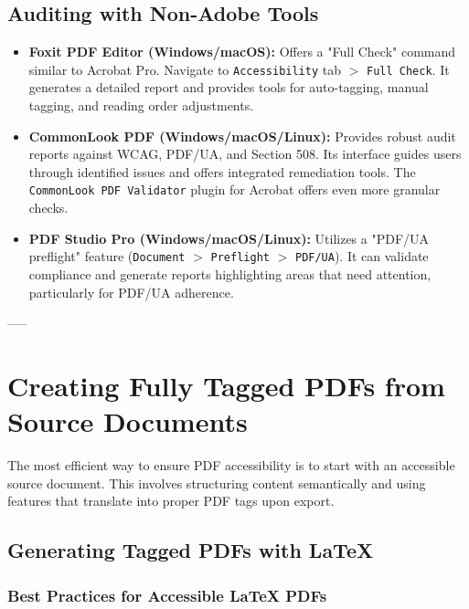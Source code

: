 \subsection{Auditing with Non-Adobe Tools}
\label{subsec:auditing-non-adobe}

\begin{itemize}

\item \textbf{Foxit PDF Editor (Windows/macOS):} Offers a "Full Check" command similar to Acrobat Pro. Navigate to \texttt{Accessibility} tab $>$ \texttt{Full Check}. It generates a detailed report and provides tools for auto-tagging, manual tagging, and reading order adjustments.

\item \textbf{CommonLook PDF (Windows/macOS/Linux):} Provides robust audit reports against WCAG, PDF/UA, and Section 508. Its interface guides users through identified issues and offers integrated remediation tools. The \texttt{CommonLook PDF Validator} plugin for Acrobat offers even more granular checks.

\item \textbf{PDF Studio Pro (Windows/macOS/Linux):} Utilizes a "PDF/UA preflight" feature (\texttt{Document} $>$ \texttt{Preflight} $>$ \texttt{PDF/UA}). It can validate compliance and generate reports highlighting areas that need attention, particularly for PDF/UA adherence.

\end{itemize}

-----

\section{Creating Fully Tagged PDFs from Source Documents}
\label{sec:tagged-pdfs-source}
The most efficient way to ensure PDF accessibility is to start with an accessible source document. This involves structuring content semantically and using features that translate into proper PDF tags upon export.

\subsection{Generating Tagged PDFs with LaTeX}
\label{subsec:tagged-pdfs-latex}

\subsubsection{Best Practices for Accessible LaTeX PDFs}

